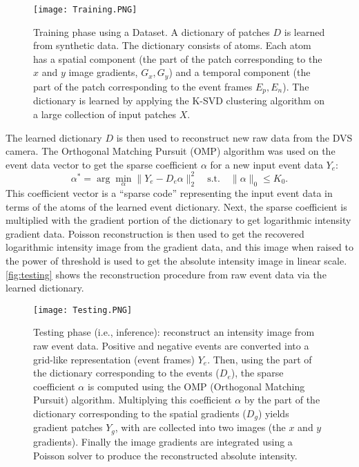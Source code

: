 \documentclass[10pt]{report}
\begin{document}
\begin{figure}
\centering
\texttt{[image: Training.PNG]}
  \caption{Training phase using a Dataset. 
  A dictionary of patches $D$ is learned from synthetic data.
  The dictionary consists of atoms. 
  Each atom has a spatial component (the part of the patch corresponding to the $x$ and $y$ image gradients, $G_x, G_y$) 
  and a temporal component (the part of the patch corresponding to the event frames $E_p, E_n$).
  The dictionary is learned by applying the K-SVD clustering algorithm on a large collection of input patches $X$.}
  \label{fig:training}
\end{figure}
    
The learned dictionary $D$ is then used to reconstruct new raw data from the DVS camera. 
The Orthogonal Matching Pursuit (OMP) algorithm \cite{Pati93asilomar} was used on the event data vector to get the sparse coefficient $\alpha$ for a new input event data $Y_e$:
\begin{equation}
    \alpha^{\ast} = \arg \min_{\alpha} \| Y_{e} - D_{e} \alpha \|_{2}^{2} \quad \textrm{s.t.} \quad \|\alpha\|_{0} \leq K_{0}.
\end{equation}
This coefficient vector is a ``sparse code'' representing the input event data in terms of the atoms of the learned event dictionary.
Next, the sparse coefficient is multiplied with the gradient portion of the dictionary to get logarithmic intensity gradient data. 
Poisson reconstruction \cite{Agrawal05iccv} \cite{Agrawal06eccv} is then used to get the recovered logarithmic intensity image from the gradient data, and this image when raised to the power of threshold is used to get the absolute intensity image in linear scale. 
\autoref{fig:testing} shows the reconstruction procedure from raw event data via the learned dictionary.

\begin{figure}
\centering
\texttt{[image: Testing.PNG]}
  \caption{Testing phase (i.e., inference): reconstruct an intensity image from raw event data.
  Positive and negative events are converted into a grid-like representation (event frames) $Y_e$.
  Then, using the part of the dictionary corresponding to the events ($D_e$), the sparse coefficient $\alpha$ is computed using the OMP (Orthogonal Matching Pursuit) algorithm. 
  Multiplying this coefficient $\alpha$ by the part of the dictionary corresponding to the spatial gradients ($D_g$) yields gradient patches $Y_g$, with are collected into two images (the $x$ and $y$ gradients). 
  Finally the image gradients are integrated using a Poisson solver to produce the reconstructed absolute intensity.
  }
  \label{fig:testing}
\end{figure}
\end{document}
